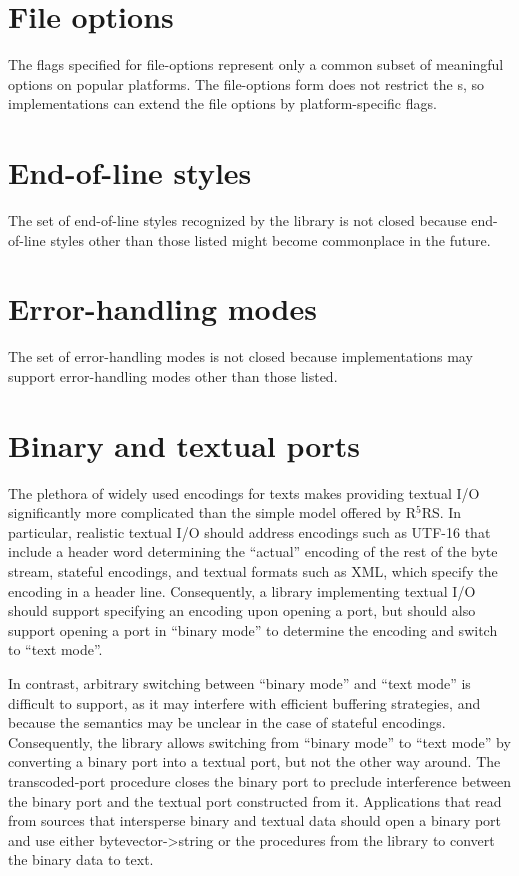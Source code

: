 \documentclass[twoside,twocolumn]{algol60}
\newcommand{\rn}[1]{R$^{#1}$RS}
\begin{document}
\section{File options}

The flags specified for {\cf file-options} represent only a common
subset of meaningful options on popular platforms.  The {\cf
  file-options} form does not restrict the s,
so implementations can extend the file options by platform-specific
flags.

\section{End-of-line styles}

The set of end-of-line styles recognized by the 
library is not closed because end-of-line styles other than those
listed might become commonplace in the future.

\section{Error-handling modes}

The set of error-handling modes is not closed because implementations
may support error-handling modes other than those listed.

\section{Binary and textual ports}

The plethora of widely used encodings for texts makes providing
textual I/O significantly more complicated than the simple model
offered by \rn{5}.  In particular, realistic textual I/O should
address encodings such as UTF-16 that include a header word
determining the ``actual'' encoding of the rest of the byte stream,
stateful encodings, and textual formats such as XML, which specify the
encoding in a header line.  Consequently, a library implementing
textual I/O should support specifying an encoding upon opening a port,
but should also support opening a port in ``binary mode'' to determine
the encoding and switch to ``text mode''.

In contrast, arbitrary switching between ``binary mode'' and ``text
mode'' is difficult to support, as it may interfere with efficient
buffering strategies, and because the semantics may be unclear in the
case of stateful encodings.  Consequently, the 
library allows switching from ``binary mode'' to ``text mode'' by
converting a binary port into a textual port, but not the other way
around.  The {\cf transcoded-port} procedure closes the binary port to
preclude interference between the binary port and the textual port
constructed from it.  Applications that read from sources that
intersperse binary and textual data should open a binary port and use
either {\cf bytevector->string} or the procedures from the
 library to convert the binary data to text.
\end{document}
